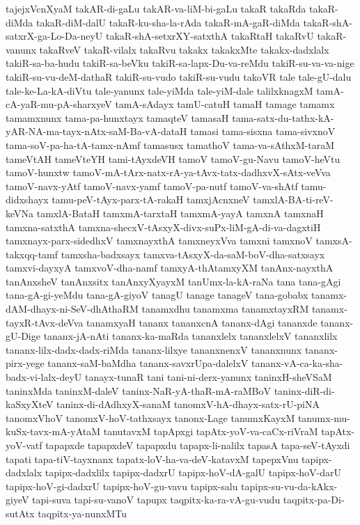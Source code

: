 {tajejxVcnXyaM
takAR-di-gaLu
takAR-va-liM-bi-gaLu
takaR
takaRda
takaR-diMda
takaR-diM-dalU
takaR-ku-sha-la-rAda
takaR-mA-gaR-diMda
takaR-shA-satxrX-ga-Lo-Da-neyU
takaR-shA-setxrXY-satxthA
takaRtaH
takaRvU
takaR-vanunx
takaRveV
takaR-vilalx
takaRvu
takakx
takakxMte
takakx-dadxlalx
takiR-sa-ba-hudu
takiR-sa-beVku
takiR-sa-lapx-Du-va-reMdu
takiR-su-va-va-nige
takiR-su-vu-deM-dathaR
takiR-su-vudo
takiR-su-vudu
takoVR
tale
tale-gU-dalu
tale-ke-La-kA-diVtu
tale-yanunx
tale-yiMda
tale-yiM-dale
talilxknagxM
tamA-cA-yaR-mu-pA-sharxyeV
tamA-sAdayx
tamU-catuH
tamaH
tamage
tamamx
tamamxnunx
tama-pa-hunxtayx
tamaqteV
tamasaH
tama-satx-du-tathx-kA-yAR-NA-ma-tayx-nAtx-saM-Ba-vA-dataH
tamasi
tama-sisxna
tama-sivxnoV
tama-soV-pa-ha-tA-tamx-nAmf
tamasusx
tamathoV
tama-va-sAthxM-taraM
tameVtAH
tameVteYH
tami-tAyxdeVH
tamoV
tamoV-gu-Navu
tamoV-heVtu
tamoV-hunxtw
tamoV-mA-tArx-natx-rA-ya-tAvx-tatx-dadhxvX-sAtx-veVva
tamoV-navx-yAtf
tamoV-navx-yamf
tamoV-pa-nutf
tamoV-va-shAtf
tamu-didxshayx
tamu-peV-tAyx-parx-tA-rakaH
tamxjAcnxneV
tamxlA-BA-ti-reV-keVNa
tamxlA-BataH
tamxmA-tarxtaH
tamxmA-yayA
tamxnA
tamxnaH
tamxna-satxthA
tamxna-shecxV-tAsxyX-divx-suPx-liM-gA-di-va-dagxtiH
tamxnayx-parx-sidedhxV
tamxnayxthA
tamxneyxVva
tamxni
tamxnoV
tamxsA-takxqq-tamf
tamxsha-badxsayx
tamxva-tAsxyX-da-saM-boV-dha-satxsayx
tamxvi-dayxyA
tamxvoV-dha-namf
tamxyA-thAtamxyXM
tanAnx-nayxthA
tanAnxsheV
tanAnxsitx
tanAnxyXyayxM
tanUmx-la-kA-raNa
tana
tana-gAgi
tana-gA-gi-yeMdu
tana-gA-giyoV
tanagU
tanage
tanageV
tana-gobabx
tanamx-dAM-dhayx-ni-SeV-dhAthaRM
tanamxdhu
tanamxma
tanamxtayxRM
tanamx-tayxR-tAvx-deVva
tanamxyaH
tananx
tananxcnA
tananx-dAgi
tananxde
tananx-gU-Dige
tananx-jA-nAti
tananx-ka-maRda
tananxlelx
tananxlelxV
tananxlilx
tananx-lilx-dadx-dadx-riMda
tananx-lilxye
tananxnenxV
tananxnunx
tananx-pirx-yege
tananx-saM-baMdha
tananx-savxrUpa-dalelxV
tananx-vA-ca-ka-sha-badx-vi-lalx-deyU
tanayx-tunaR
tani
tani-ni-derx-yanunx
taninxH-sheVSaM
taninxMda
taninxM-daleV
taninx-NaR-yA-thaR-mA-raMBoV
taninx-diR-di-kaSxyXteV
taninx-di-dAdhxyX-sanaM
tanomxV-hA-dhayx-satx-rU-piNA
tanomxVhoV
tanomxV-hoV-tathxsayx
tanonx-Lage
tanumxKayxM
tanumx-mu-kuSx-tavx-mA-yAtaM
tanutavxM
tapApxgi
tapAtx-yoV-va-caCx-riVraM
tapAtx-yoV-vatf
tapapxde
tapapxdeV
tapapxdu
tapapx-li-nalilx
tapasA
tapa-seV-tAyxdi
tapati
tapa-tiV-tayxnanx
tapatx-loV-ha-va-deV-katavxM
tapepxVnu
tapipx-dadxlalx
tapipx-dadxlilx
tapipx-dadxrU
tapipx-hoV-dA-galU
tapipx-hoV-darU
tapipx-hoV-gi-dadxrU
tapipx-hoV-gu-vavu
tapipx-salu
tapipx-su-vu-da-kAkx-giyeV
tapi-suva
tapi-su-vanoV
tapupx
taqpitx-ka-ra-vA-gu-vudu
taqpitx-pa-Di-sutAtx
taqpitx-ya-nunxMTu
}
